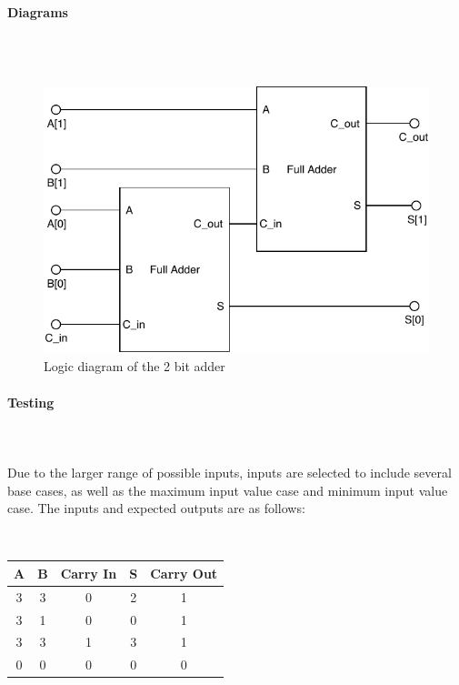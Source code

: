 \documentclass{article}
\begin{document}
    \paragraph{Diagrams}
    \hfill\\\\
    \begin{figure}[H]
        \centering
        \includegraphics{../diagrams/alu/adder/adder_2.pdf}
        \caption{Logic diagram of the 2 bit adder}
    \end{figure}

    \paragraph{Testing}
    \hfill\\\\
    Due to the larger range of possible inputs, inputs are selected to include
    several base cases, as well as the maximum input value case and minimum
    input value case. The inputs and expected outputs are as follows:

    \hfill\\
    \begin{tabular}{|c|c|c||c|c|}
        \hline
        A & B & Carry In & S & Carry Out
        \\\hline\hline
        3 & 3 & 0 & 2 & 1
        \\\hline\hline
        3 & 1 & 0 & 0 & 1
        \\\hline\hline
        3 & 3 & 1 & 3 & 1
        \\\hline\hline
        0 & 0 & 0 & 0 & 0
        \\\hline
    \end{tabular}
\end{document}
